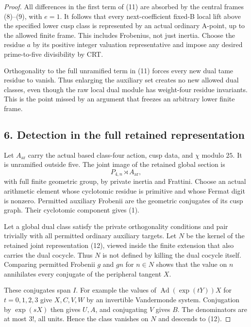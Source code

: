 \begin{proof}
All differences in the first term of (11) are absorbed by the central frames (8)--(9), with $e=1$. It follows that every next-coefficient fixed-B local lift above the specified lower cusp class is represented by an actual ordinary A-point, up to the allowed finite frame. This includes Frobenius, not just inertia. Choose the residue $a$ by its positive integer valuation representative and impose any desired prime-to-five divisibility by CRT.

Orthogonality to the full unramified term in (11) forces every new dual tame residue to vanish. Thus enlarging the auxiliary set creates no new allowed dual classes, even though the raw local dual module has weight-four residue invariants. This is the point missed by an argument that freezes an arbitrary lower finite frame.

\subsection*{6. Detection in the full retained representation}
Let $A_{\mathrm{ar}}$ carry the actual based class-four action, cusp data, and $\chi$ modulo $25$. It is unramified outside five. The joint image of the retained global section is
\[
 P_{4,n}\rtimes A_{\mathrm{ar}},
 \tag{12}
\]
with full finite geometric group, by private inertia and Frattini. Choose an actual arithmetic element whose cyclotomic residue is primitive and whose Fermat digit is nonzero. Permitted auxiliary Frobenii are the geometric conjugates of its cusp graph. Their cyclotomic component gives (1).

Let a global dual class satisfy the private orthogonality conditions and pair trivially with all permitted ordinary auxiliary targets. Let $N$ be the kernel of the retained joint representation (12), viewed inside the finite extension that also carries the dual cocycle. Thus $N$ is not defined by killing the dual cocycle itself. Comparing permitted Frobenii $g$ and $gn$ for $n\in N$ shows that the value on $n$ annihilates every conjugate of the peripheral tangent $X$.

These conjugates span $I$. For example the values of $\operatorname{Ad}(\exp(tY))X$ for $t=0,1,2,3$ give $X,C,V,W$ by an invertible Vandermonde system. Conjugation by $\exp(sX)$ then gives $U,A$, and conjugating $V$ gives $B$. The denominators are at most $3!$, all units. Hence the class vanishes on $N$ and descends to (12).


\end{proof}
